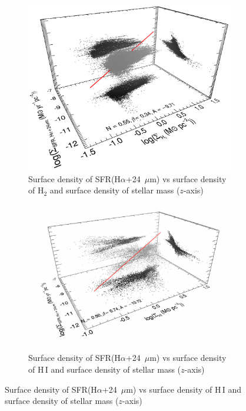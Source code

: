          
\begin{figure}
  \centering
   \begin{subfigure}[b]{0.5\textwidth}
        \centering
        \includegraphics[width=\textwidth]{../image_paper1/es_tot_halpha_vs_h22_f.png}
        \caption{Surface density of SFR(H$\alpha$+24~$\mu$m) vs surface density of H$_2$ and surface density of stellar mass ($z$-axis)}
        \label{fig:es,all,halpha,h2}
    \end{subfigure}
     \hfill
      \begin{subfigure}[b]{0.5\textwidth}
        \centering
        \includegraphics[width=\textwidth]{../image_paper1/es_tot_halpha_vs_hi2.png}
        \caption{Surface density of SFR(H$\alpha$+24~$\mu$m) vs surface density of H\,{\sc I} and surface density of stellar mass ($z$-axis)}

\end{subfigure}
\end{figure}
